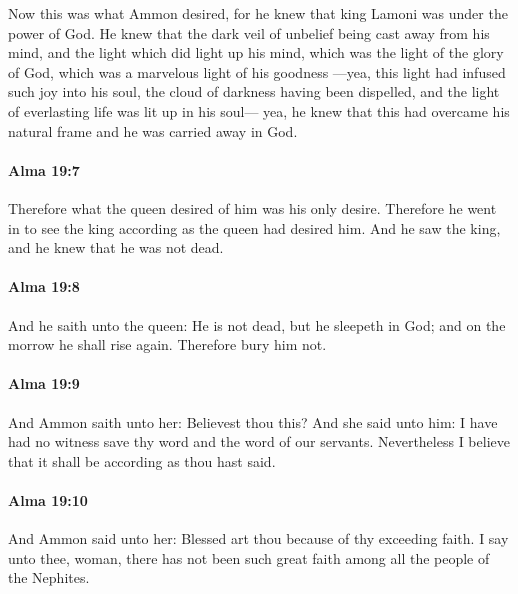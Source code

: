 			Now this was what Ammon desired,
			for he knew that king Lamoni was under the power of God.
			He knew that the dark veil of unbelief being cast away from his mind,
			and the light which did light up his mind,
			which was the light of the glory of God,
			which was a marvelous light of his goodness
			---yea, this light had infused such joy into his soul,
			the cloud of darkness having been dispelled,
			and the light of everlasting life was lit up in his soul---
			yea, he knew that this had overcame his natural frame
			and he was carried away in God.

		\paragraph{Alma 19:7} %
			\label{ALMA-19-7}

			Therefore what the queen desired of him was his only desire.
			Therefore he went in to see the king
			according as the queen had desired him.
			And he saw the king,
			and he knew that he was not dead.

		\paragraph{Alma 19:8} %
			\label{ALMA-19-8}

			And he saith unto the queen:
			He is not dead, but he sleepeth in God;
			and on the morrow he shall rise again.
			Therefore bury him not.

		\paragraph{Alma 19:9} %
			\label{ALMA-19-9}

			And Ammon saith unto her:
			Believest thou this?
			And she said unto him:
			I have had no witness save thy word and the word of our servants.
			Nevertheless I believe that it shall be according as thou hast said.

		\paragraph{Alma 19:10} %
			\label{ALMA-19-10}

			And Ammon said unto her:
			Blessed art thou because of thy exceeding faith.
			I say unto thee, woman,
			there has not been such great faith among all the people of the Nephites.

